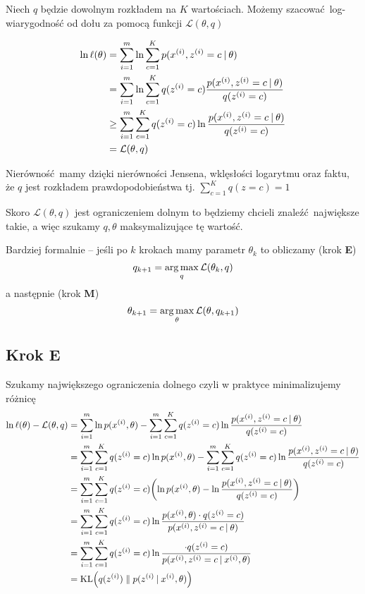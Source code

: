 Niech \( q \) będzie dowolnym rozkładem na \( K \) wartościach. Możemy szacować log-wiarygodność od dołu za pomocą funkcji \( \mathcal{L}(\theta, q) \)

\begin{align*}
    \ln \ell(\theta)
        &= \sum_{i=1}^m \ln \sum_{c=1}^K p(x^{(i)}, z^{(i)} = c \:\vert\: \theta) \\
        &= \sum_{i=1}^m \ln \sum_{c=1}^K q(z^{(i)} = c) \frac{p(x^{(i)}, z^{(i)} = c \:\vert\: \theta)}{q(z^{(i)}=c)} \\
        &\geq \sum_{i=1}^m \sum_{c=1}^K q(z^{(i)} = c) \ln \frac{p(x^{(i)}, z^{(i)} = c \:\vert\: \theta)}{q(z^{(i)}=c)} \\
        &= \mathcal{L}(\theta, q)
\end{align*}

Nierówność mamy dzięki nierówności Jensena, wklęsłości logarytmu oraz faktu, że \( q \) jest rozkładem prawdopodobieństwa tj. \( \sum_{c=1}^K q(z = c) = 1 \)

Skoro \( \mathcal{L}(\theta, q) \) jest ograniczeniem dolnym to będziemy chcieli znaleźć największe takie, a więc szukamy \( q, \theta \) maksymalizujące tę wartość.

Bardziej formalnie -- jeśli po \( k \) krokach mamy parametr \( \theta_k \) to obliczamy (krok \textbf{E})
\[
    q_{k + 1} = \operatorname*{arg\,max}_q \mathcal{L}(\theta_k, q)
\]
a następnie (krok \textbf{M})
\[
    \theta_{k + 1} = \operatorname*{arg\,max}_\theta \mathcal{L}(\theta, q_{k + 1})
\]

\subsection{Krok E}

Szukamy największego ograniczenia dolnego czyli w praktyce minimalizujemy różnicę
\begin{align*}
    \ln \ell(\theta) - \mathcal{L}(\theta, q)
        &= \sum_{i=1}^m \ln p(x^{(i)}, \theta) - \sum_{i=1}^m \sum_{c=1}^K q(z^{(i)} = c) \ln \frac{p(x^{(i)}, z^{(i)} = c \given \theta)}{q(z^{(i)}=c)} \\
        &= \sum_{i=1}^m \sum_{c=1}^K q(z^{(i)} = c) \ln p(x^{(i)}, \theta) - \sum_{i=1}^m \sum_{c=1}^K q(z^{(i)} = c) \ln \frac{p(x^{(i)}, z^{(i)} = c \given \theta)}{q(z^{(i)}=c)} \\
        &= \sum_{i=1}^m \sum_{c=1}^K  q(z^{(i)} = c) \pars{\ln p(x^{(i)}, \theta) - \ln \frac{p(x^{(i)}, z^{(i)} = c \given \theta)}{q(z^{(i)}=c)}} \\
        &= \sum_{i=1}^m \sum_{c=1}^K q(z^{(i)} = c) \ln \frac{p(x^{(i)}, \theta) \cdot q(z^{(i)}=c)}{p(x^{(i)}, z^{(i)} = c \given \theta)} \\
        &= \sum_{i=1}^m \sum_{c=1}^K q(z^{(i)} = c) \ln \frac{\cdot q(z^{(i)}=c)}{p(x^{(i)}, z^{(i)} = c \given x^{(i)}, \theta)} \\
        &= \KL{q(z^{(i)})}{p(z^{(i)} \given x^{(i)}, \theta)}
\end{align*}

